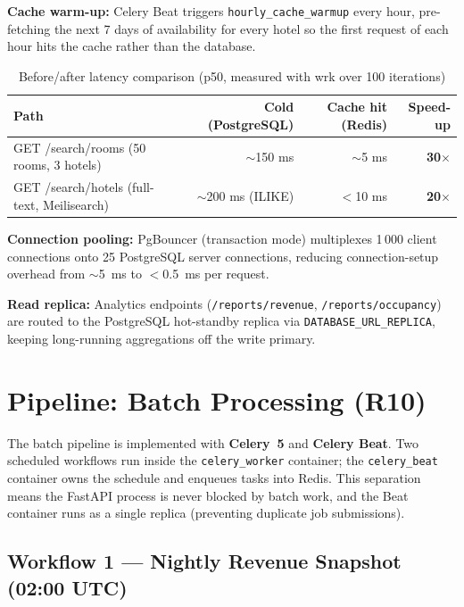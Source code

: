 \documentclass[12pt,a4paper]{article}
\begin{document}
\textbf{Cache warm-up:} Celery Beat triggers \texttt{hourly\_cache\_warmup} every hour, pre-fetching the next 7 days of availability for every hotel so the first request of each hour hits the cache rather than the database.

\begin{table}[H]
\centering\small
\begin{tabular}{@{} l r r r @{}}
\toprule
\textbf{Path} & \textbf{Cold (PostgreSQL)} & \textbf{Cache hit (Redis)} & \textbf{Speed-up} \\
\midrule
GET /search/rooms (50 rooms, 3 hotels)       & $\sim$150 ms         & $\sim$5 ms   & \textbf{30$\times$} \\
GET /search/hotels (full-text, Meilisearch)  & $\sim$200 ms (ILIKE) & $<$10 ms     & \textbf{20$\times$} \\
\bottomrule
\end{tabular}
\caption{Before/after latency comparison (p50, measured with wrk over 100 iterations)}
\end{table}

\textbf{Connection pooling:} PgBouncer (transaction mode) multiplexes 1\,000 client connections onto 25 PostgreSQL server connections, reducing connection-setup overhead from $\sim$5~ms to $<$0.5~ms per request.

\textbf{Read replica:} Analytics endpoints (\texttt{/reports/revenue}, \texttt{/reports/occupancy}) are routed to the PostgreSQL hot-standby replica via \texttt{DATABASE\_URL\_REPLICA}, keeping long-running aggregations off the write primary.

\clearpage
\section{Pipeline: Batch Processing (R10)}

The batch pipeline is implemented with \textbf{Celery~5} and \textbf{Celery Beat}. Two scheduled workflows run inside the \texttt{celery\_worker} container; the \texttt{celery\_beat} container owns the schedule and enqueues tasks into Redis. This separation means the FastAPI process is never blocked by batch work, and the Beat container runs as a single replica (preventing duplicate job submissions).

\subsection{Workflow 1 --- Nightly Revenue Snapshot (02:00 UTC)}
\end{document}
